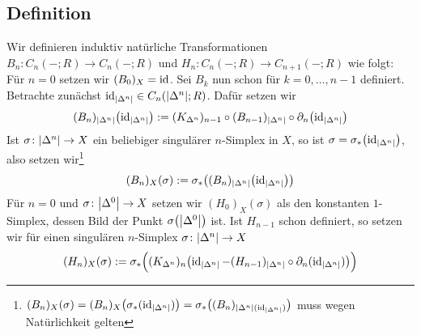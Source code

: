 \subsection[Definition von Zerteilungsoperatoren]{Definition} %
\label{sub:139}
Wir definieren induktiv natürliche Transformationen $B_n \colon C_n(-;R) \to C_n(-;R)$ und $H_n \colon C_n(-;R) \to C_{n+1}(-;R)$ wie folgt: Für $n=0$ setzen wir
$(B_0)_X = \id$. Sei $B_k$ nun schon für $k=0, \ldots ,n-1$ definiert. Betrachte zunächst $\id_{\abs*{\Delta^n}} \in C_n \enbrace*{\abs*{\Delta^n};R}$. Dafür setzen wir 
\[
	(B_n)_{\abs*{\Delta^n}} \enbrace*{\id_{\abs*{\Delta^n}}} :=  (K_{\Delta^n})_{n-1} \circ (B_{n-1})_{\abs*{\Delta^n}}\circ \partial_n \enbrace*{\id_{\abs*{\Delta^n}}} 
\]
Ist $\sigma \colon \abs*{\Delta^n} \to X$ ein beliebiger singulärer $n$-Simplex in $X$, so ist $\sigma = \sigma_*\enbrace*{\id_{\abs*{\Delta^n}}}$, also setzen 
wir\footnote{$(B_n)_X(\sigma) = (B_n)_X\enbrace*{\sigma_*(\id_{\abs*{\Delta^n}})}= \sigma_*\enbrace[\big]{(B_n)_{\abs*{\Delta^n}(\id_{\abs*{\Delta^n}})}}$ muss wegen 
Natürlichkeit gelten}
\[
	(B_n)_X(\sigma) := \sigma_* \enbrace*{ (B_n)_{\abs*{\Delta^n}} \enbrace*{\id_{\abs*{\Delta^n}}}} 
\]
Für $n=0$ und $\sigma \colon\abs*{\Delta^0} \to X$ setzen wir $(H_0)_X(\sigma)$ als den konstanten $1$-Simplex, dessen Bild der Punkt $\sigma\enbrace*{\abs*{\Delta^0}}$ ist.
Ist $H_{n-1}$ schon definiert, so setzen wir für einen singulären $n$-Simplex $\sigma \colon \abs*{\Delta^n} \to X$
\[
	(H_n)_X(\sigma) := \sigma_* \enbrace[\Big]{ (K_{\Delta^n})_n \enbrace[\big]{ \id_{\abs*{\Delta^n}} - (H_{n-1})_{\abs*{\Delta^n}}\circ\partial_n 
	\enbrace{\id_{\abs*{\Delta^n}}}}} 
\]
